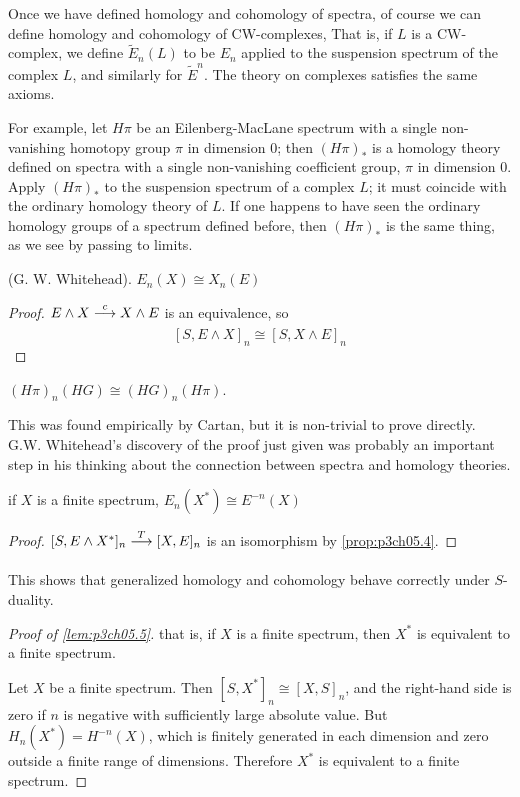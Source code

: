 \documentclass[../main]{subfiles}
\begin{document}
Once we have defined homology and cohomology of spectra, of course we can define homology and cohomology of CW-complexes, That is, if $L$ is a CW-complex, we define $\widetilde{E}_n(L)$ to be $E_n$ applied to the suspension spectrum of the complex $L$, and similarly for $\widetilde{E}^n$. The theory on complexes satisfies the same axioms.

For example, let $H\pi$ be an Eilenberg-MacLane spectrum with a single non-vanishing homotopy group $\pi$ in dimension 0; then $(H\pi)_\ast$ is a homology theory  defined on spectra with a single non-vanishing coefficient group, $\pi$ in dimension 0. Apply $(H\pi)_\ast$ to the suspension spectrum of a complex $L$; it must coincide with the ordinary homology theory of $L$. If one happens to have seen the ordinary homology groups of a spectrum defined before, then $(H\pi)_\ast$ is the same thing, as we see by passing to limits.

\begin{theorem}\label{thm:p3c06.2}
(G. W. Whitehead). $E_n(X) \cong X_n(E)$
\end{theorem}

\begin{proof}
$E\wedge X \lar{c} X \wedge E$ is an equivalence, so
\[[S, E\wedge X]_n \cong [S, X\wedge E]_n\]
\end{proof}

\begin{corollary}\label{cor:p3c06.3}
$(H\pi)_n(HG) \cong (HG)_n(H\pi)$.
\end{corollary}

This was found empirically by Cartan, but it is non-trivial to prove directly. G.W. Whitehead's discovery of the proof just given was probably an important step in his thinking about the connection between spectra and homology theories.

\begin{proposition}\label{prop:p3c06.4}
if $X$ is a finite spectrum, $E_n(X^\ast) \cong E^{-n}(X)$
\end{proposition}

\begin{proof}
$[S, E\wedge X^\ast]_n \lar{T} [X, E]_n$ is an isomorphism by \ref{prop:p3ch05.4}.
\end{proof}
This shows that generalized homology and cohomology behave correctly under $S$-duality.

\begin{proof}[Proof of \ref{lem:p3ch05.5}]\label{proof:p3ch05.5}
that is, if $X$ is a finite spectrum, then $X^\ast$ is equivalent to a finite spectrum.

Let $X$ be a finite spectrum. Then $\left[ S, X^\ast \right]_n \cong [X, S]_n$, and the right-hand side is zero if $n$ is negative with sufficiently large absolute value. But $H_n(X^\ast)=H^{-n}(X)$, which is finitely generated in each dimension and zero outside a finite range of dimensions. Therefore $X^\ast$ is equivalent to a finite spectrum. 
\end{proof}
\end{document}
